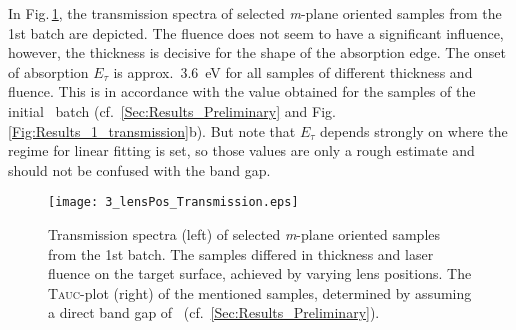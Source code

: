 In Fig.\,\ref{Fig:Results_3_lensTransmission}, the transmission spectra of selected \textit{m}-plane oriented samples from the 1st batch are depicted.
The fluence does not seem to have a significant influence, however, the thickness is decisive for the shape of the absorption edge.
The onset of absorption $E_\tau$ is approx.\ \qty{3.6}{\eV} for all samples of different thickness and fluence.
This is in accordance with the value obtained for the samples of the initial \cro\ batch (cf.~\ref{Sec:Results_Preliminary} and Fig.\,\ref{Fig:Results_1_transmission}b).
But note that $E_\tau$ depends strongly on where the regime for linear fitting is set, so those values are only a rough estimate and should not be confused with the band gap.

\begin{figure}
    \centering
    \texttt{[image: 3\_lensPos\_Transmission.eps]}
    \caption{
        Transmission spectra (left) of selected \textit{m}-plane oriented samples from the 1st batch.
        The samples differed in thickness and laser fluence on the target surface, achieved by varying lens positions.
        The \textsc{Tauc}-plot (right) of the mentioned samples, determined by assuming a direct band gap of \cro\ (cf.~\ref{Sec:Results_Preliminary}).
    }
    \label{Fig:Results_3_lensTransmission}
\end{figure}